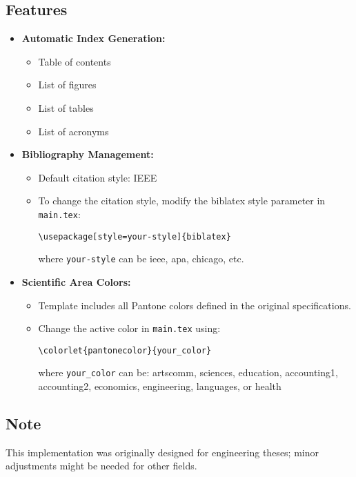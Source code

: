 \subsection{Features}
\begin{itemize}
    \item \textbf{Automatic Index Generation:}
    \begin{itemize}
        \item Table of contents
        \item List of figures
        \item List of tables
        \item List of acronyms
    \end{itemize}
    
    \item \textbf{Bibliography Management:}
    \begin{itemize}
        \item Default citation style: IEEE
        \item To change the citation style, modify the biblatex style parameter in \texttt{main.tex}:
        \begin{verbatim}
\usepackage[style=your-style]{biblatex}
        \end{verbatim}
        where \texttt{your-style} can be ieee, apa, chicago, etc.
    \end{itemize}
    
    \item \textbf{Scientific Area Colors:}
    \begin{itemize}
        \item Template includes all Pantone colors defined in the original specifications.
        \item Change the active color in \texttt{main.tex} using:
        \begin{verbatim}
\colorlet{pantonecolor}{your_color}
        \end{verbatim}
        where \texttt{your\_color} can be: artscomm, sciences, education, accounting1, accounting2, economics, engineering, languages, or health
    \end{itemize}
\end{itemize}

\subsection{Note}
This implementation was originally designed for engineering theses; minor adjustments might be needed for other fields.